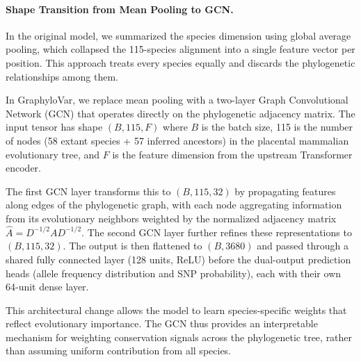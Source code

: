 \paragraph{Shape Transition from Mean Pooling to GCN.}
In the original model, we summarized the species dimension using global average
pooling, which collapsed the 115-species alignment into a single feature vector
per position. This approach treats every species equally and discards the
phylogenetic relationships among them.

In GraphyloVar, we replace mean pooling with a two-layer Graph Convolutional
Network (GCN) that operates directly on the phylogenetic adjacency matrix.
The input tensor has shape $(B, 115, F)$ where $B$ is the batch size, 115 is
the number of nodes (58 extant species + 57 inferred ancestors) in the
placental mammalian evolutionary tree, and $F$ is the feature dimension from the
upstream Transformer encoder.

The first GCN layer transforms this to $(B, 115, 32)$ by propagating features
along edges of the phylogenetic graph, with each node aggregating information
from its evolutionary neighbors weighted by the normalized adjacency matrix
$\hat{A} = D^{-1/2} A D^{-1/2}$. The second GCN layer further refines
these representations to $(B, 115, 32)$. The output is then flattened to
$(B, 3680)$ and passed through a shared fully connected layer (128 units, ReLU)
before the dual-output prediction heads (allele frequency distribution and
SNP probability), each with their own 64-unit dense layer.

This architectural change allows the model to learn species-specific weights
that reflect evolutionary importance.  The GCN thus provides an interpretable mechanism for weighting
conservation signals across the phylogenetic tree, rather than assuming uniform
contribution from all species.


